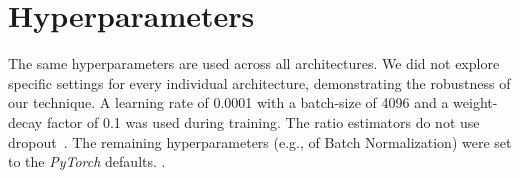 \documentclass[fleqn,usenatbib]{mnras}
\begin{document}
\section{Hyperparameters}
\label{appendix:sec:appendix_architecture}
The same hyperparameters are used across all architectures.
We did not explore specific settings for every individual architecture,
demonstrating the robustness of our technique.
A learning rate of 0.0001 with a batch-size of 4096 and a weight-decay factor of 0.1 was used during training.
The ratio estimators do not use dropout~\citep{hinton2012improving}.
The remaining hyperparameters (e.g., of Batch Normalization) were set to the \emph{PyTorch} defaults. \protect{}.
\end{document}
